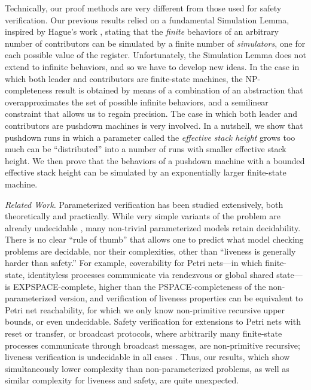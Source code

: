 \documentclass{llncs}
\begin{document}
Technically, our proof methods are very different from those used for safety
verification. 
Our previous results \cite{egm13} relied on a fundamental Simulation Lemma,
inspired by Hague's work \cite{Hague11}, stating that the {\em finite} behaviors of an arbitrary number of contributors can be simulated by a finite 
number of {\em simulators}, one for each possible value of the register. 
Unfortunately, the Simulation Lemma 
does not extend to infinite behaviors, and so we have to develop new ideas.
In the case in which both leader and contributors are finite-state machines, 
the NP-completeness
result is obtained by means of a combination of an abstraction
that overapproximates the set of possible infinite behaviors, and a semilinear constraint that
allows us to regain precision. The case in which both leader and contributors are 
pushdown machines is very involved. In a nutshell, we show that pushdown runs 
in which a parameter called the \emph{effective stack height} grows too much
can be ``distributed'' into a number of runs with smaller effective stack height.
We then prove that the behaviors of a pushdown machine with a bounded effective stack height 
can be simulated by an exponentially larger finite-state machine.

\noindent
\emph{Related Work.}
Parameterized verification has been studied extensively, both theoretically and practically.
While very simple variants of the problem are already undecidable \cite{AxKozen86}, 
many non-trivial parameterized models retain decidability.
There is no clear ``rule of thumb'' that allows one to predict what model checking 
problems are decidable, nor their complexities, other than ``liveness is generally harder than safety.''
For example, coverability for Petri nets---in which finite-state, identityless processes communicate via rendezvous or global shared state---
is EXPSPACE-complete, 
higher than the PSPACE-completeness of the non-parameterized version, and
verification of liveness properties can be equivalent to Petri net reachability, 
for which we only know non-primitive recursive upper bounds, or even undecidable.
Safety verification for extensions to Petri nets with reset or transfer, or broadcast protocols, where arbitrarily many finite-state processes communicate
through broadcast messages, 
are non-primitive recursive; liveness verification is undecidable in all cases \cite{ACJT96,EFM99,rmeyer2008}.
Thus, our results, which show simultaneously lower complexity than non-parameterized problems, as well as similar complexity for
liveness and safety, are quite unexpected.
\end{document}
